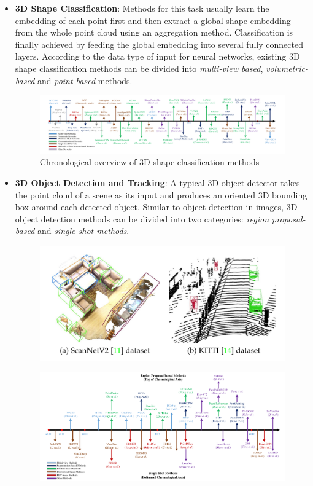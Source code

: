 \documentclass[11pt,a4paper]{article}
\begin{document}
\begin{itemize}
    \item \textbf{3D Shape Classification}: Methods for this task usually learn the embedding of each point first and then extract a global shape embedding from the whole point cloud using an aggregation method. Classification is finally achieved by feeding the global embedding into several fully connected layers. According to the data type of input for neural networks, existing 3D shape classification methods can be divided into \textit{multi-view based}, \textit{volumetric-based} and \textit{point-based} methods.
    \begin{figure}[H]
        \centering
        \includegraphics[scale=0.7]{imgs/pointcloud-classification-methods.jpg}
        \caption{Chronological overview of 3D shape classification methods}
    \end{figure}
    \item \textbf{3D Object Detection and Tracking}: A typical 3D object detector takes the point cloud of a scene as its input and produces an oriented 3D bounding box around each detected object. Similar to object detection in images, 3D object detection methods can be divided into two categories: \textit{region proposal-based} and \textit{single shot methods}.
    \begin{figure}[H]
        \centering
        \includegraphics[scale=1.2]{imgs/pointcloud-object-detection.jpg}
    \end{figure}
    \begin{figure}[H]
        \centering
        \includegraphics[scale=0.7]{imgs/pointcloud-object-detection-methods.jpg}

\end{figure}
\end{itemize}
\end{document}
